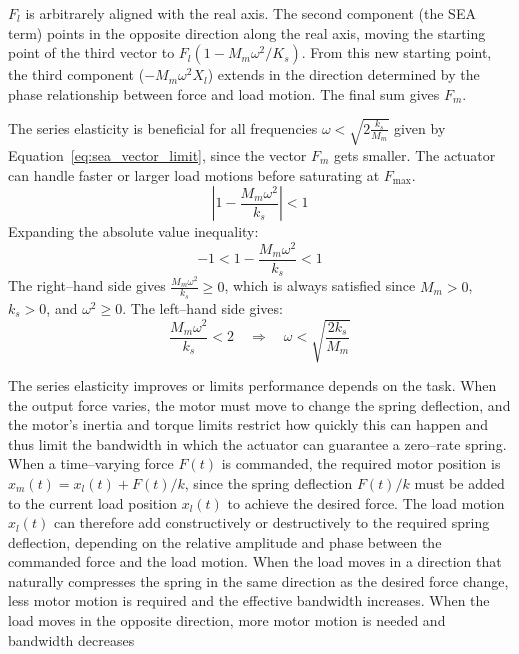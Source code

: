 \documentclass[11pt,a4paper,twoside,openright]{book}
\begin{document}
$F_l$ is arbitrarely aligned with the real axis. The second component (the SEA term) points in the opposite direction along the real axis, moving the starting point of the third vector to $F_l(1 - M_m\omega^2/K_s)$. From this new starting point, the third component ($-M_m\omega^2 X_l$) extends in the direction determined by the phase relationship between force and load motion. The final sum gives $F_m$.
 
The series elasticity is beneficial for all frequencies $\omega < \sqrt{2\frac{k_s}{M_m}}$ given by Equation~\eqref{eq:sea_vector_limit}, since the vector $F_m$ gets smaller. The actuator can handle faster or larger load motions before saturating at $F_{\text{max}}$.
\begin{equation}
    \left|1 - \frac{M_m \omega^2}{k_s}\right| < 1
    \label{eq:sea_vector_condition}
\end{equation}
Expanding the absolute value inequality:
\begin{equation}
    -1 < 1 - \frac{M_m \omega^2}{k_s} < 1
\end{equation}
The right--hand side gives $ \frac{M_m \omega^2}{k_s} \ge 0 $, which is always satisfied since $M_m > 0$, $k_s > 0$, and $\omega^2 \ge 0$. The left--hand side gives:
\begin{equation}
    \frac{M_m \omega^2}{k_s} < 2 \quad \Longrightarrow \quad \omega < \sqrt{\frac{2 k_s}{M_m}}
    \label{eq:sea_vector_limit}
\end{equation}

The series elasticity improves or limits performance depends on the task. When the output force varies, the motor must move to change the spring deflection, and the motor's inertia and torque limits restrict how quickly this can happen and thus limit the bandwidth in which the actuator can guarantee a zero--rate spring. When a time--varying force $F(t)$ is commanded, the required motor position is $x_m(t) = x_l(t) + F(t)/k$, since the spring deflection $F(t)/k$ must be added to the current load position $x_l(t)$ to achieve the desired force. The load motion $x_l(t)$ can therefore add constructively or destructively to the required spring deflection, depending on the relative amplitude and phase between the commanded force and the load motion. When the load moves in a direction that naturally compresses the spring in the same direction as the desired force change, less motor motion is required and the effective bandwidth increases. When the load moves in the opposite direction, more motor motion is needed and bandwidth decreases
\end{document}

